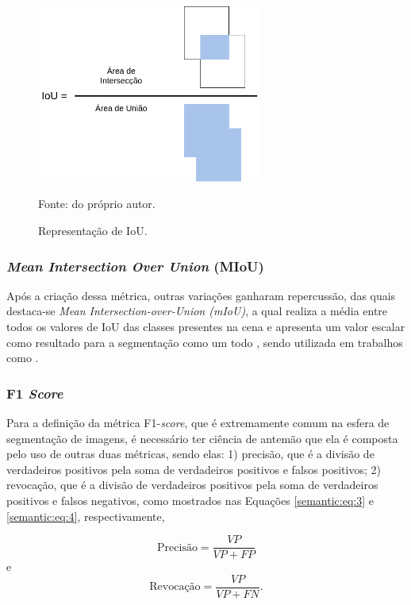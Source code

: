 \begin{figure}[H]
    \centering
    \caption{Representação de IoU.}
    \includegraphics[height=2.3in]{recursos/imagens/semantic/IoU.png}
    \label{semantic:fig:1}

    Fonte: do próprio autor.
\end{figure}

\subsubsection{\textit{Mean Intersection Over Union} (MIoU)}
\begin{sloppypar}
Após a criação dessa métrica, outras variações ganharam repercussão, das quais destaca-se \textit{Mean Intersection-over-Union (mIoU)}, a qual realiza a média entre todos os valores de IoU das classes presentes na cena e apresenta um valor escalar como resultado para a segmentação como um todo \cite{Minaee2021}, sendo utilizada em trabalhos como \cite{Mohan2020}.
\end{sloppypar}


\subsubsection{F1 \textit{Score}}
\label{semantic:f1}
Para a definição da métrica F1-\textit{score}, que é extremamente comum na esfera de segmentação de imagens, é necessário ter ciência de antemão que ela é composta pelo uso de outras duas métricas, sendo elas: 1) precisão, que é a divisão de verdadeiros positivos pela soma de verdadeiros positivos e falsos positivos; 2) revocação, que é a divisão de verdadeiros positivos pela soma de verdadeiros positivos e falsos negativos, como mostrados nas Equações \ref{semantic:eq:3} e \ref{semantic:eq:4}, respectivamente,

\begin{equation}
    \label{semantic:eq:3}
    \text{Precisão} = \frac{VP}{VP + FP}
\end{equation}
e
\begin{equation}
    \label{semantic:eq:4}
    \text{Revocação} = \frac{VP}{VP + FN}.
\end{equation}

